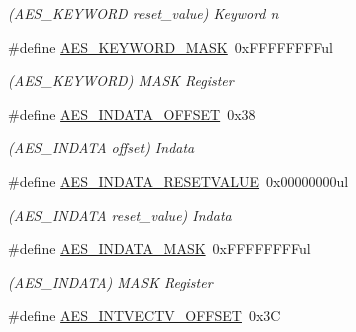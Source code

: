\begin{DoxyCompactItemize}
\begin{DoxyCompactList}\small\item\em (A\+E\+S\+\_\+\+K\+E\+Y\+W\+O\+R\+D reset\+\_\+value) Keyword n \end{DoxyCompactList}\item 
\hypertarget{group___s_a_m_l21___a_e_s_ga5c4c97c4c5130e8f70a9c1a90a844c40}{}\#define \hyperlink{group___s_a_m_l21___a_e_s_ga5c4c97c4c5130e8f70a9c1a90a844c40}{A\+E\+S\+\_\+\+K\+E\+Y\+W\+O\+R\+D\+\_\+\+M\+A\+S\+K}~0x\+F\+F\+F\+F\+F\+F\+F\+Ful\label{group___s_a_m_l21___a_e_s_ga5c4c97c4c5130e8f70a9c1a90a844c40}

\begin{DoxyCompactList}\small\item\em (A\+E\+S\+\_\+\+K\+E\+Y\+W\+O\+R\+D) M\+A\+S\+K Register \end{DoxyCompactList}\item 
\hypertarget{group___s_a_m_l21___a_e_s_ga44da44594903a13541f89f88b344de14}{}\#define \hyperlink{group___s_a_m_l21___a_e_s_ga44da44594903a13541f89f88b344de14}{A\+E\+S\+\_\+\+I\+N\+D\+A\+T\+A\+\_\+\+O\+F\+F\+S\+E\+T}~0x38\label{group___s_a_m_l21___a_e_s_ga44da44594903a13541f89f88b344de14}

\begin{DoxyCompactList}\small\item\em (A\+E\+S\+\_\+\+I\+N\+D\+A\+T\+A offset) Indata \end{DoxyCompactList}\item 
\hypertarget{group___s_a_m_l21___a_e_s_gaa7300347777050df07b81c1aeab9c53f}{}\#define \hyperlink{group___s_a_m_l21___a_e_s_gaa7300347777050df07b81c1aeab9c53f}{A\+E\+S\+\_\+\+I\+N\+D\+A\+T\+A\+\_\+\+R\+E\+S\+E\+T\+V\+A\+L\+U\+E}~0x00000000ul\label{group___s_a_m_l21___a_e_s_gaa7300347777050df07b81c1aeab9c53f}

\begin{DoxyCompactList}\small\item\em (A\+E\+S\+\_\+\+I\+N\+D\+A\+T\+A reset\+\_\+value) Indata \end{DoxyCompactList}\item 
\hypertarget{group___s_a_m_l21___a_e_s_ga180788b3469c7f201c64f2ab908c0bae}{}\#define \hyperlink{group___s_a_m_l21___a_e_s_ga180788b3469c7f201c64f2ab908c0bae}{A\+E\+S\+\_\+\+I\+N\+D\+A\+T\+A\+\_\+\+M\+A\+S\+K}~0x\+F\+F\+F\+F\+F\+F\+F\+Ful\label{group___s_a_m_l21___a_e_s_ga180788b3469c7f201c64f2ab908c0bae}

\begin{DoxyCompactList}\small\item\em (A\+E\+S\+\_\+\+I\+N\+D\+A\+T\+A) M\+A\+S\+K Register \end{DoxyCompactList}\item 
\hypertarget{group___s_a_m_l21___a_e_s_ga7294686ad7460e413304e1149f3041f4}{}\#define \hyperlink{group___s_a_m_l21___a_e_s_ga7294686ad7460e413304e1149f3041f4}{A\+E\+S\+\_\+\+I\+N\+T\+V\+E\+C\+T\+V\+\_\+\+O\+F\+F\+S\+E\+T}~0x3\+C\label{group___s_a_m_l21___a_e_s_ga7294686ad7460e413304e1149f3041f4}


\end{DoxyCompactItemize}
